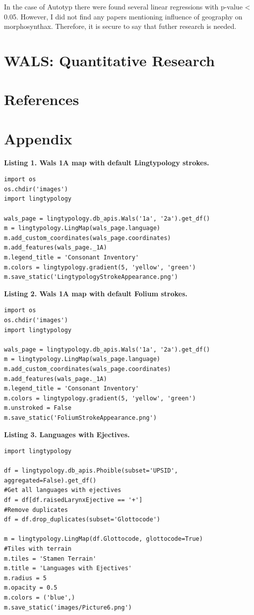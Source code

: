 \documentclass[a4paper,12pt]{article}
\begin{document}
In the case of Autotyp there were found several linear regressions with p-value < 0.05. However, I did not find any papers mentioning influence of geography on morphosynthax. Therefore, it is secure to say that futher research is needed.
\newpage

\section{WALS: Quantitative Research}



\newpage

\section{References}
\printbibliography[type=misc, title=Programming Tools]
\printbibliography[type=manual, title=Documentation]
\printbibliography[type=online, title=Online Recources]
\printbibliography[type=article, title=Articles]
\printbibliography[filter=other, title=Other]
\printbibliography[type=techreport]
\newpage
\section{Appendix}

\textbf{Listing 1. Wals 1A map with default Lingtypology strokes.}
\begin{lstlisting}
import os
os.chdir('images')
import lingtypology

wals_page = lingtypology.db_apis.Wals('1a', '2a').get_df()
m = lingtypology.LingMap(wals_page.language)
m.add_custom_coordinates(wals_page.coordinates)
m.add_features(wals_page._1A)
m.legend_title = 'Consonant Inventory'
m.colors = lingtypology.gradient(5, 'yellow', 'green')
m.save_static('LingtypologyStrokeAppearance.png')
\end{lstlisting}
\bigskip

\textbf{Listing 2. Wals 1A map with default Folium strokes.}
\begin{lstlisting}
import os
os.chdir('images')
import lingtypology

wals_page = lingtypology.db_apis.Wals('1a', '2a').get_df()
m = lingtypology.LingMap(wals_page.language)
m.add_custom_coordinates(wals_page.coordinates)
m.add_features(wals_page._1A)
m.legend_title = 'Consonant Inventory'
m.colors = lingtypology.gradient(5, 'yellow', 'green')
m.unstroked = False
m.save_static('FoliumStrokeAppearance.png')
\end{lstlisting}
\bigskip

\textbf{Listing 3. Languages with Ejectives.}
\begin{lstlisting}
import lingtypology

df = lingtypology.db_apis.Phoible(subset='UPSID', aggregated=False).get_df()
#Get all languages with ejectives
df = df[df.raisedLarynxEjective == '+']
#Remove duplicates
df = df.drop_duplicates(subset='Glottocode')

m = lingtypology.LingMap(df.Glottocode, glottocode=True)
#Tiles with terrain
m.tiles = 'Stamen Terrain'
m.title = 'Languages with Ejectives'
m.radius = 5
m.opacity = 0.5
m.colors = ('blue',)
m.save_static('images/Picture6.png')
\end{lstlisting}
\end{document}
